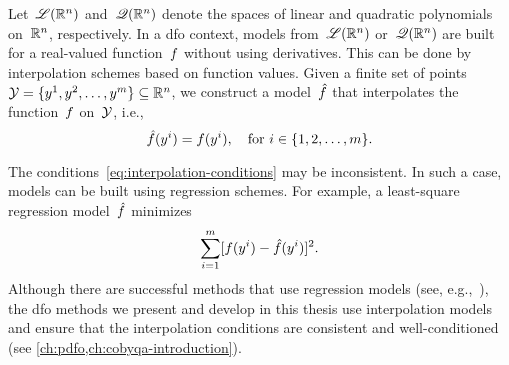 Let~$\mathscr{L}(\mathbb{R}^n)$ and~$\mathscr{Q}(\mathbb{R}^n)$ denote the spaces of linear and quadratic polynomials on~$\mathbb{R}^n$, respectively.
In a \gls{dfo} context, models from~$\mathscr{L}(\mathbb{R}^n)$ or~$\mathscr{Q}(\mathbb{R}^n)$ are built for a real-valued function~$f$ without using derivatives.
This can be done by interpolation schemes based on function values.
Given a finite set of points~$\xpt = \set{y^1, y^2, \dots, y^m} \subseteq \R^n$, we construct a model~$\objm$ that interpolates the function~$f$ on~$\xpt$, i.e.,
\begin{equation}
    \label{eq:interpolation-conditions}
    \objm(y^i) = \obj(y^i), \quad \text{for~$i \in \set{1, 2, \dots, m}$}.
\end{equation}

The conditions~\cref{eq:interpolation-conditions} may be inconsistent.
In such a case, models can be built using regression schemes.
For example, a least-square regression model~$\objm$ minimizes
\begin{equation*}
    \sum_{i = 1}^m [\obj(y^i) - \objm(y^i)]^2.
\end{equation*}
Although there are successful methods that use regression models (see, e.g.,~\cite{Billups_Larson_Graf_2013,Conn_Scheinberg_Vicente_2008b}), the \gls{dfo} methods we present and develop in this thesis use interpolation models and ensure that the interpolation conditions are consistent and well-conditioned (see \cref{ch:pdfo,ch:cobyqa-introduction}).

